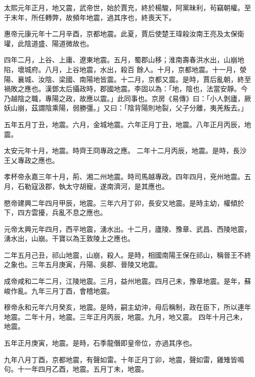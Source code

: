 \begin{pinyinscope}
 太熙元年正月，地又震，武帝世，始於賈充，終於楊駿，阿黨昧利，茍竊朝權。至于末年，所任轉弊，故頻年地震，過其序也，終喪天下。



 惠帝元康元年十二月辛酉，京都地震。此夏，賈后使楚王瑋殺汝南王亮及太保衛瓘，此陰道盛、陽道微故也。



 四年二月，上谷、上庸、遼東地震。五月，蜀郡山移；淮南壽春洪水出，山崩地陷，壞城府。八月，上谷地震，水出，殺百
 餘人。十月，京都地震。十一月，滎陽、襄城、汝陰、梁國、南陽地皆震。十二月，京都又震。是時，賈后亂朝，終至禍敗之應也。漢鄧太后攝政時，郡國地震。李固以為：「地，陰也，法當安靜。今乃越陰之職，專陽之政，故應以震。」此同事也。京房《易傳》曰：「小人剝廬，厥妖山崩，茲謂陰乘陽，弱勝彊。」又曰：「陰背陽則地裂，父子分離，夷羌叛去。」



 五年五月丁丑，地震。六月，金城地震。六年正月丁丑，地震。八年正月丙辰，地震。



 太安元年十月，地震。時齊王冏專政之應。
 二年十二月丙辰，地震。是時，長沙王乂專政之應也。



 孝杯帝永嘉三年十月，荊、湘二州地震。時司馬越專政。四年四月，兗州地震。五月，石勒寇汲郡，執太守胡寵，遂南濟河，是其應也。



 愍帝建興二年四月甲辰，地震。三年六月丁卯，長安又地震。是時主幼，權傾於下，四方雲擾，兵亂不息之應也。



 元帝太興元年四月，西平地震，湧水出。十二月，廬陵、豫章、武昌、西陵地震，湧水出，山崩。干寶以為王敦陵上之應也。



 二年五月己丑，祁山地震，山崩，殺人。是時，相國南陽王保在祁山，稱晉王不終之象也。三年五月庚寅，丹陽、吳郡、晉陵又地震。



 成帝咸和二年二月，江陵地震。三月，益州地震。四月己未，豫章地震。是年，蘇峻作亂。九年三月丁酉，會稽地震。



 穆帝永和元年六月癸亥，地震。是時，嗣主幼沖，母后稱制，政在臣下，所以連年地震。二年十月，地震。三年正月丙辰，地震。九月，地又震。
 四年十月己未，地震。



 五年正月庚寅，地震。是時，石季龍僭即皇帝位，亦過其序也。



 九年八月丁酉，京都地震，有聲如雷。十年正月丁卯，地震，聲如雷，雞雉皆鳴句。十一年四月乙酉，地震。五月丁未，地震。




\end{pinyinscope}
